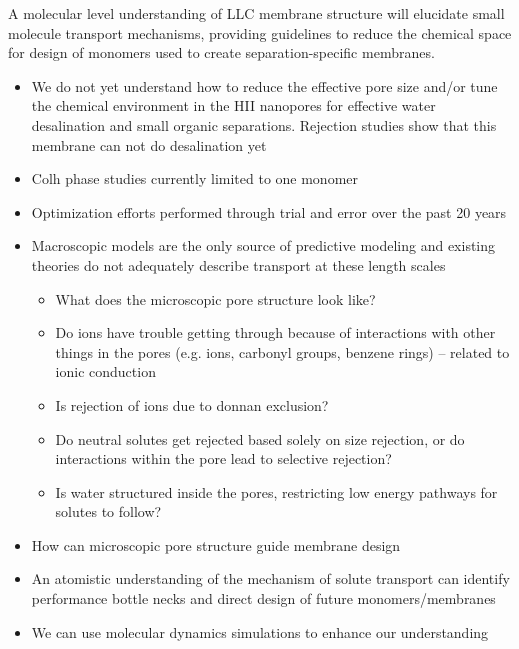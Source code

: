 A molecular level understanding of LLC membrane structure will elucidate small molecule transport mechanisms, providing guidelines to reduce the chemical space for design of monomers used to create separation-specific membranes.
\begin{itemize}
        \item We do not yet understand how to reduce the effective pore size and/or tune the chemical environment in the HII nanopores for effective water desalination and small organic separations. Rejection studies show that this membrane can not do desalination yet
	\item Colh phase studies currently limited to one monomer
        \item Optimization efforts performed through trial and error over the past 20 years
        \item Macroscopic models are the only source of predictive modeling and existing theories do not adequately describe transport at these length scales
        \begin{itemize}
                \item What does the microscopic pore structure look like?
		\item Do ions have trouble getting through because of interactions with other things in the pores (e.g. ions, carbonyl groups, benzene rings) -- related to ionic conduction
		\item Is rejection of ions due to donnan exclusion?
                \item Do neutral solutes get rejected based solely on size rejection, or do interactions within the pore lead to selective rejection?
                \item Is water structured inside the pores, restricting low energy pathways for solutes to follow? %
	\end{itemize}
	\item How can microscopic pore structure guide membrane design
	\item An atomistic understanding of the mechanism of solute transport can identify performance bottle necks and direct design of future monomers/membranes
	\item We can use molecular dynamics simulations to enhance our understanding 
\end{itemize}
 
